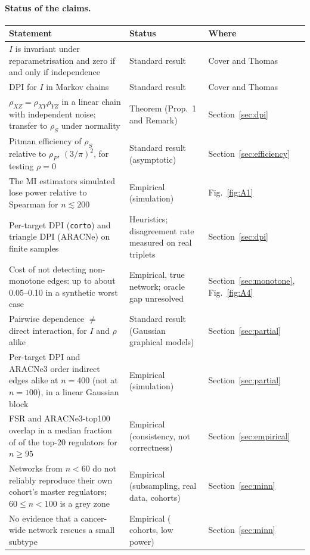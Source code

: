 \documentclass[11pt,a4paper]{article}
\theoremstyle{plain}
\theoremstyle{remark}
\newcommand{\MI}{I}
\newcommand{\rhoS}{\rho_{S}}
\newcommand{\rhoP}{\rho_{P}}
\newcommand{\FSR}{FSR}
\begin{document}
\paragraph{Status of the claims.}
\begin{center}\small
\begin{tabular}{>{\raggedright\arraybackslash}p{}>{\raggedright\arraybackslash}p{}>{\raggedright\arraybackslash}p{}}
\toprule
Statement & Status & Where\\
\midrule
$\MI$ is invariant under reparametrisation and zero if and only if independence & Standard result & Cover and Thomas~\cite{cover2006}\\
DPI for $\MI$ in Markov chains & Standard result & Cover and Thomas~\cite{cover2006}\\
$\rho_{XZ}=\rho_{XY}\rho_{YZ}$ in a linear chain with independent noise; transfer to $\rhoS$ under normality & Theorem (Prop.~1 and Remark) & Section~\ref{sec:dpi}\\
Pitman efficiency of $\rhoS$ relative to $\rhoP$, $(3/\pi)^2$, for testing $\rho=0$ & Standard result (asymptotic) & Section~\ref{sec:efficiency}\\
The MI estimators simulated lose power relative to Spearman for $n\lesssim200$ & Empirical (simulation) & Fig.~\ref{fig:A1}\\
Per-target DPI (\texttt{corto}) and triangle DPI (ARACNe) on finite samples & Heuristics; disagreement rate measured on real triplets & Section~\ref{sec:dpi}\\
Cost of not detecting non-monotone edges: up to about 0.05--0.10 in a synthetic worst case & Empirical, true network; oracle gap unresolved & Section~\ref{sec:monotone}, Fig.~\ref{fig:A4}\\
Pairwise dependence $\neq$ direct interaction, for $\MI$ and $\rho$ alike & Standard result (Gaussian graphical models) & Section~\ref{sec:partial}\\
Per-target DPI and ARACNe3 order indirect edges alike at $n=400$ (not at $n=100$), in a linear Gaussian block & Empirical (simulation) & Section~\ref{sec:partial}\\
\FSR{} and ARACNe3-top100 overlap in a median fraction of \KAvsBmediantopTwoZero{} of the top-20 regulators for $n\ge95$ & Empirical (consistency, not correctness) & Section~\ref{sec:empirical}\\
Networks from $n<60$ do not reliably reproduce their own cohort's master regulators; $60\le n<100$ is a grey zone & Empirical (subsampling, real data, \Ksubsamplencohorts{} cohorts) & Section~\ref{sec:minn}\\
No evidence that a cancer-wide network rescues a small subtype & Empirical (\Kpooledncohorts{} cohorts, low power) & Section~\ref{sec:minn}\\
\bottomrule
\end{tabular}
\end{center}
\end{document}
